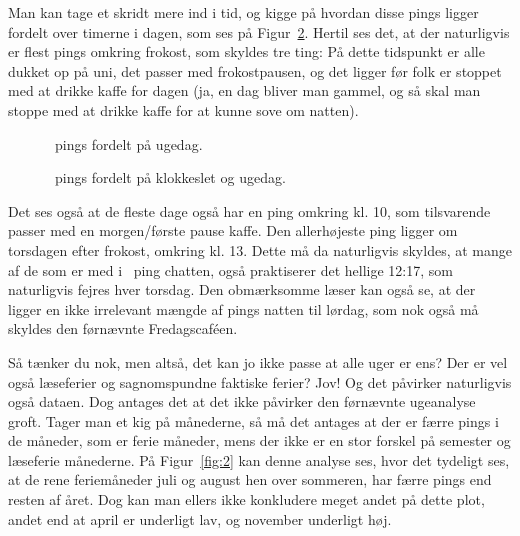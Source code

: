 \begin{article}
Man kan tage et skridt mere ind i tid, og kigge på hvordan disse pings ligger fordelt over timerne i dagen, som ses på Figur~\ref{fig:1}. Hertil ses det, at der naturligvis er flest pings omkring frokost, som skyldes tre ting: På dette tidspunkt er alle dukket op på uni, det passer med frokostpausen, og det ligger før folk er stoppet med at drikke kaffe for dagen (ja, en dag bliver man gammel, og så skal man stoppe med at drikke kaffe for at kunne sove om natten).

\begin{figure}[H]
	\centering
	\resizebox{\columnwidth}{!}{}
	\vspace{-25pt}
	\caption{\protect\coffee\ pings fordelt på ugedag.}
	\label{fig:0}
\end{figure}
\begin{figure}[H]
	\centering
	\resizebox{\columnwidth}{!}{}
	\vspace{-25pt}
	\caption{\protect\coffee\ pings fordelt på klokkeslet og ugedag.}
	\label{fig:1}
\end{figure}

Det ses også at de fleste dage også har en ping omkring kl. 10, som tilsvarende passer med en morgen/første pause kaffe. Den allerhøjeste ping ligger om torsdagen efter frokost, omkring kl. 13. Dette må da naturligvis skyldes, at mange af de som er med i \coffee\ ping chatten, også praktiserer det hellige 12:17\texttrademark, som naturligvis fejres hver torsdag. Den obmærksomme læser kan også se, at der ligger en ikke irrelevant mængde af pings natten til lørdag, som nok også må skyldes den førnævnte Fredagscaféen.


Så tænker du nok, men altså, det kan jo ikke passe at alle uger er ens? Der er vel også læseferier og sagnomspundne faktiske ferier? Jov! Og det påvirker naturligvis også dataen. Dog antages det at det ikke påvirker den førnævnte ugeanalyse groft. Tager man et kig på månederne, så må det antages at der er færre pings i de måneder, som er ferie måneder, mens der ikke er en stor forskel på semester og læseferie månederne. På Figur~\ref{fig:2} kan denne analyse ses, hvor det tydeligt ses, at de rene feriemåneder juli og august hen over sommeren, har færre pings end resten af året. Dog kan man ellers ikke konkludere meget andet på dette plot, andet end at april er underligt lav, og november underligt høj.


\end{article}
